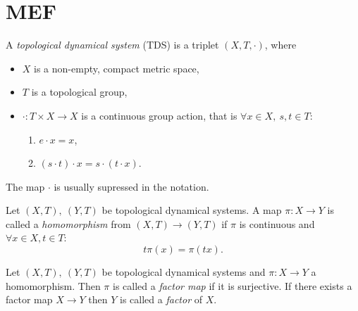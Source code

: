 \section{MEF}
\begin{definition}
  A \emph{topological dynamical system} (TDS) is a triplet $(X,T,\cdot)$, where
  \begin{itemize}
    \item $X$ is a non-empty, compact metric space,
    \item $T$ is a topological group,
    \item $\cdot : T \times  X \to X$ is a continuous group action, that is $\forall x \in X, \ s,t \in T$: 
    \begin{enumerate}
      \item $ e \cdot x = x$,
      \item $(s \cdot t)\cdot x = s \cdot (t \cdot x)$.
    \end{enumerate}
  \end{itemize}
\end{definition}
\begin{remark}
  The map $\cdot$ is usually supressed in the notation.
\end{remark}

\begin{definition}
  Let $(X,T), \ (Y,T)$ be topological dynamical systems.
  A map $\pi : X \to Y$ is called a \emph{homomorphism} from $(X,T) \to (Y,T)$ if $\pi$ is continuous and $\forall x \in X, t \in T$:
  \begin{equation*}
     t \pi (x) = \pi (t x).
  \end{equation*}
\end{definition}
\begin{definition}
   Let $(X,T), \ (Y,T)$ be topological dynamical systems and $\pi: X \to Y$ a homomorphism.
   Then $\pi$ is called a \emph{factor map} if it is surjective.
   If there exists a factor map $X \to Y$ then $Y$ is called a \emph{factor} of $X$.
\end{definition}

